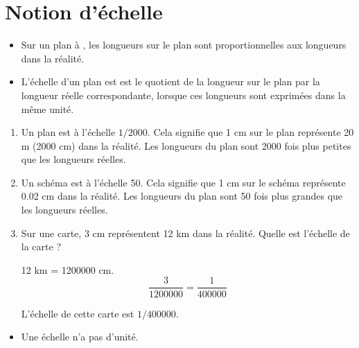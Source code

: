 \documentclass[12pt,a4paper]{article}
\begin{document}
\section{Notion d'échelle}

\begin{mydef}
	\begin{itemize}
		\item 	Sur un plan à , les longueurs sur le plan sont proportionnelles aux longueurs dans la réalité.
		
		\item  L'échelle d'un plan est  est le quotient de la longueur sur le plan par la longueur réelle correspondante, lorsque ces longueurs sont exprimées dans la même unité.
	\end{itemize}

\end{mydef}

\begin{myexs}
	\begin{enumerate}
		\item Un plan est à l'échelle $ 1 / \num{2000}$. Cela signifie que 1 cm sur le plan représente 20 m (\num{2000} cm) dans la réalité. Les longueurs du plan sont 2000 fois plus petites que les longueurs réelles.
		
		
		\item Un schéma est à l'échelle 50. Cela signifie que 1 cm sur le schéma représente \num{0.02} cm dans la réalité. Les longueurs du plan sont 50 fois plus grandes que les longueurs réelles.
		
		
		\item Sur une carte, 3 cm représentent  12 km dans la réalité. Quelle est l'échelle de la carte ?
		
		12 km = \num{1200000} cm.
		\begin{equation*}
		\dfrac{3}{\num{1200000}} = \dfrac{1}{\num{400000}}
		\end{equation*}
		
		L'échelle de cette carte est $1 / \num{400000}$.
	\end{enumerate}
\end{myexs}

\begin{myrem}
	\begin{itemize}
		\item Une échelle n'a pas d'unité.
	\end{itemize}
\end{myrem}
\end{document}
